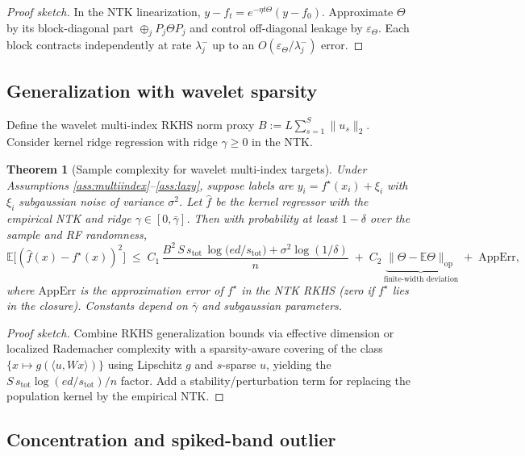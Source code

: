 \documentclass[11pt]{article}
\newtheorem{theorem}{Theorem}
\theoremstyle{remark}
\begin{document}
\begin{proof}[Proof sketch]
In the NTK linearization, $y-f_t = e^{-\eta t \Theta}(y-f_0)$. Approximate $\Theta$ by its block-diagonal part $\oplus_j P_j \Theta P_j$ and control off-diagonal leakage by $\varepsilon_\Theta$. Each block contracts independently at rate $\lambda_j^{-}$ up to an $O(\varepsilon_\Theta/\lambda_j^{-})$ error.
\end{proof}

\subsection{Generalization with wavelet sparsity}

Define the wavelet multi-index RKHS norm proxy $B := L \sum_{s=1}^{S} \|u_s\|_2$. Consider kernel ridge regression with ridge $\gamma \ge 0$ in the NTK.

\begin{theorem}[Sample complexity for wavelet multi-index targets]\label{thm:gen}
Under Assumptions \ref{ass:multiindex}–\ref{ass:lazy}, suppose labels are $y_i = f^\star(x_i) + \xi_i$ with $\xi_i$ subgaussian noise of variance $\sigma^2$. Let $\hat f$ be the kernel regressor with the empirical NTK and ridge $\gamma \in [0,\bar\gamma]$. Then with probability at least $1-\delta$ over the sample and RF randomness,
\[
\mathbb{E}\big[(\hat f(x)-f^\star(x))^2\big] \;\le\; C_1\, \frac{B^2\, S\, s_\mathrm{tot}\,\log\!\big(e d / s_\mathrm{tot}\big) + \sigma^2 \log(1/\delta)}{n}
\;+\; C_2\, \underbrace{\|\Theta - \mathbb{E}\Theta\|_{\mathrm{op}}}_{\text{finite-width deviation}}
\;+\; \mathrm{AppErr},
\]
where $\mathrm{AppErr}$ is the approximation error of $f^\star$ in the NTK RKHS (zero if $f^\star$ lies in the closure). Constants depend on $\bar\gamma$ and subgaussian parameters.
\end{theorem}

\begin{proof}[Proof sketch]
Combine RKHS generalization bounds via effective dimension or localized Rademacher complexity with a sparsity-aware covering of the class $\{x \mapsto g(\langle u, Wx\rangle)\}$ using Lipschitz $g$ and $s$-sparse $u$, yielding the $S\,s_\mathrm{tot}\log(ed/s_\mathrm{tot})/n$ factor. Add a stability/perturbation term for replacing the population kernel by the empirical NTK.
\end{proof}

\subsection{Concentration and spiked-band outlier}
\end{document}
